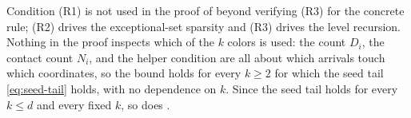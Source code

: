 \begin{remark}
Condition (R1) is not used in the proof of  beyond verifying (R3) for the concrete rule; (R2) drives the
exceptional-set sparsity and (R3) drives the level recursion. Nothing in the proof inspects which of the $k$ colors is used:
the count $D_i$, the contact count $N_i$, and the helper condition are all about which arrivals touch which coordinates, so
the bound holds for every $k\ge2$ for which the seed tail \eqref{eq:seed-tail} holds, with no dependence on $k$. Since the
seed tail holds for every $k\le d$ and every fixed $k$, so does .
\end{remark}
